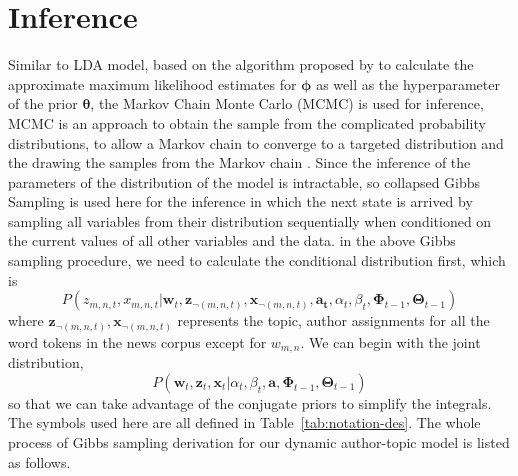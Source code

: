 \section{Inference}\label{inferenceofthemodel}

Similar to LDA model, based on the algorithm proposed by \cite{blei2003latent} to calculate the approximate maximum likelihood estimates for $\boldsymbol{\phi}$ as well as the hyperparameter of the prior $\boldsymbol{\theta}$, the Markov Chain Monte Carlo (MCMC) is used for inference, MCMC is an approach to obtain the sample from the complicated probability distributions, to allow a Markov chain to converge to a targeted distribution and the drawing the samples from the Markov chain \cite{gilks1996introducing}. Since the inference of the parameters of the distribution of the model is intractable, so collapsed Gibbs Sampling is used here for the inference in which the next state is arrived by sampling all variables from their distribution sequentially when conditioned on the current values of all other variables and the data.
in the above Gibbs sampling procedure, we need to calculate the conditional distribution first, which is
\begin{equation}
P({z}_{m, n, t},{x}_{m, n, t}| \mathbf{w}_t,\mathbf{z}_{\neg(m, n, t)}, \mathbf{x}_{\neg(m, n, t)},\mathbf{a_t},\alpha_t, \beta_t,\boldsymbol{\Phi}_{t-1}, \boldsymbol{\Theta}_{t-1})
\label{eq:conditional}
\end{equation}
where $\mathbf{z}_{\neg(m, n, t)}, \mathbf{x}_{\neg(m, n, t)}$ represents the topic, author assignments for all the word tokens in the news corpus except for $w_{m,n}$. We can begin with the joint distribution,
\begin{equation}
P(\mathbf{w}_t, \mathbf{z}_t ,\mathbf{x}_t| \alpha_t, \beta_t,\mathbf{a}, \boldsymbol{\Phi}_{t-1}, \boldsymbol{\Theta}_{t-1})
\end{equation}
so that we can take advantage of the conjugate priors to simplify the integrals. The symbols used here are all defined in Table~\ref{tab:notation-des}. The whole process of Gibbs sampling derivation for our dynamic author-topic model is listed as follows.
